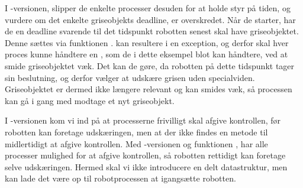 I -versionen, slipper de enkelte processer desuden for at holde styr på tiden, og vurdere om det enkelte griseobjekts deadline, er overskredet. Når de starter, har de en deadline svarende til det tidspunkt robotten senest skal have griseobjektet. Denne sættes via funktionen .  kan resultere i en exception, og derfor skal hver proces kunne håndtere en , som de i dette eksempel blot kan håndtere, ved at smide griseobjektet væk. Det kan de gøre, da robotten på dette tidspunkt tager sin beslutning, og derfor vælger at udskære grisen uden specialviden. Griseobjektet er dermed ikke længere relevant og kan smides væk, så processen kan gå i gang med modtage et nyt griseobjekt.

I -versionen kom vi ind på at processerne frivilligt skal afgive kontrollen, før robotten kan foretage udskæringen, men at der ikke findes en metode til midlertidigt at afgive kontrollen. Med -versionen og funktionen , har alle processer mulighed for at afgive kontrollen, så robotten rettidigt kan foretage selve udskæringen. Hermed skal vi ikke introducere en delt datastruktur, men kan lade det være op til robotprocessen at igangsætte robotten.
  




